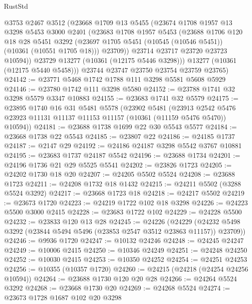 \begin{lexlean}{RustStd}
\begin{coremodule}
          @3753
          @2467
          @3512
          (@23668
            @1709
            @13
            @5455
            (@23674
              @1708
              @1957
              @13
              @3298
              @5453
              @3000
              @2401
              (@23683
                @1708
                @1957
                @5453
                (@23688
                  @1706
                  @120
                  @18
                  @28
                  @5451
                  @3292
                  (@23697 @1705 @5451 (@10545 (@10546 @5451)) (@10361 (@10551 @1705 @18)))
                  @23709))
              @23714
              @23717
              @23720
              @23723
              @10594))
          @23729
          @13277
          (@10361 (@12175 @5446 @3298)))
        @13277
        (@10361 (@12175 @5440 @5458)))
      @23744
      @23747
      @23750
      @23754
      @23759
      @23765)
@24142 := @23771 @5468 @1742 @1788 @111 @3298 @5581 @5608 @5929
@24146 := @23780 @1742 @111 @3298 @5580
@24152 := @23788 @1741 @32 @3298 @5579 @3347 @10883
@24155 := @23683 @1741 @32 @5579
@24175 := @23895
    @1740
    @16
    @31
    @5481
    @5578
    (@23902
      @5481
      (@23913 @2542 @5476 @23923 @11131 @11137 @11153 @11157 (@10361 (@11159 @5476 @5470)) @10594))
@24181 := @23688 @1738 @1699 @22 @30 @5543 @5577
@24184 := @23668 @1738 @22 @5543
@24185 := @23807 @22
@24186 := @24185 @1737
@24187 := @2147 @29
@24192 := @24186 @24187 @3298 @5542 @3767 @10881
@24195 := @23683 @1737 @24187 @5542
@24196 := @23688 @1734
@24201 := @24196 @1736 @21 @29 @5525 @5541
@24202 := @23826 @1723
@24205 := @24202 @1730 @18 @20
@24207 := @24205 @5502 @5524
@24208 := @23688 @1723
@24211 := @24208 @1732 @18 @1432
@24215 := @24211 @5502 (@3288 @5524 @3292)
@24217 := @23668 @1723 @18
@24218 := @24217 @5502
@24219 := @23673 @1720
@24223 := @24219 @1722 @102 @18 @3298
@24226 := @24223 @5500 @3000 @2415
@24228 := @23683 @1722 @102
@24229 := @24228 @5500
@24232 := @23833 @120 @13 @28
@24245 := @24226
    (@24229 (@24232 @5498 @3292 (@23844 @5494 @5496 (@23853 @2547 @3512 @23863 @11157)) @23709))
@24246 := @9936 @1720
@24247 := @10132 @24246
@24248 := @24245 @24247
@24249 := @10006 @2415
@24250 := @10346 @24249
@24251 := @24248 @24250
@24252 := @10030 @2415
@24253 := @10350 @24252
@24254 := @24251 @24253
@24256 := @10355 (@10357 @1720)
@24260 := @24215 (@24218 (@24254 @24256 @10594))
@24264 := @23688 @1730 @120 @20 @28
@24266 := @24264 @5524 @3292
@24268 := @23668 @1730 @20
@24269 := @24268 @5524
@24274 := @23673 @1728 @1687 @102 @20 @3298

\end{coremodule}
\end{lexlean}
